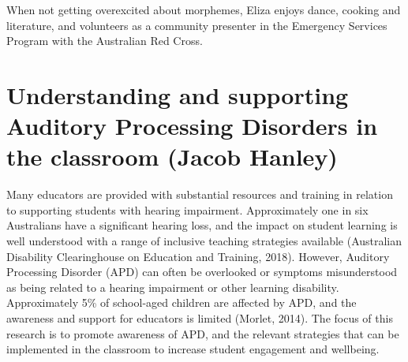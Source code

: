 \documentclass[twoside,14pt,a4paper,notitlepage]{memoir}
\begin{document}
When not getting overexcited about morphemes, Eliza enjoys dance, cooking and literature, and volunteers as a community presenter in the Emergency Services Program with the Australian Red Cross. 



\section*{Understanding and supporting Auditory Processing Disorders in the classroom (Jacob Hanley)}
\label{aut:hanley}

Many educators are provided with substantial resources and training in relation to supporting students with hearing impairment. Approximately one in six Australians have a significant hearing loss, and the impact on student learning is well understood with a range of inclusive teaching strategies available (Australian Disability Clearinghouse on Education and Training, 2018).  However, Auditory Processing Disorder (APD) can often be overlooked or symptoms misunderstood as being related to a hearing impairment or other learning disability.  Approximately 5\% of school-aged children are affected by APD, and the awareness and support for educators is limited (Morlet, 2014). The focus of this research is to promote awareness of APD, and the relevant strategies that can be implemented in the classroom to increase student engagement and wellbeing.  
\end{document}
